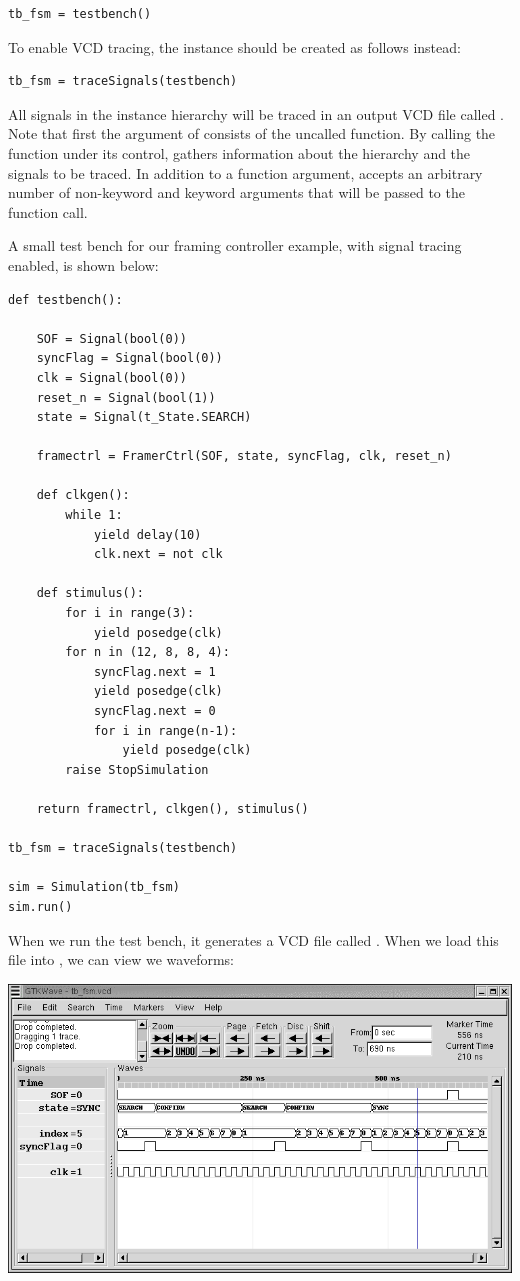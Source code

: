 \begin{verbatim}
tb_fsm = testbench()
\end{verbatim}

To enable VCD tracing, the instance should be created as follows
instead:

\begin{verbatim}
tb_fsm = traceSignals(testbench)
\end{verbatim}

All signals in the instance hierarchy will be traced in an output VCD
file called . Note that first the argument of
 consists of the uncalled function. By
calling the function under its control, 
gathers information about the hierarchy and the signals to be traced.
In addition to a function argument,  accepts
an arbitrary number of non-keyword and keyword arguments that will be
passed to the function call. 

A small test bench for our framing controller example,
with signal tracing enabled, is shown below:


\begin{verbatim}
def testbench():

    SOF = Signal(bool(0))
    syncFlag = Signal(bool(0))
    clk = Signal(bool(0))
    reset_n = Signal(bool(1))
    state = Signal(t_State.SEARCH)
            
    framectrl = FramerCtrl(SOF, state, syncFlag, clk, reset_n)

    def clkgen():
        while 1:
            yield delay(10)
            clk.next = not clk

    def stimulus():
        for i in range(3):
            yield posedge(clk)
        for n in (12, 8, 8, 4):
            syncFlag.next = 1
            yield posedge(clk)
            syncFlag.next = 0
            for i in range(n-1):
                yield posedge(clk)
        raise StopSimulation
        
    return framectrl, clkgen(), stimulus()

tb_fsm = traceSignals(testbench)

sim = Simulation(tb_fsm)
sim.run()
\end{verbatim}

When we run the test bench, it generates a VCD file
called . When we load this file into
, we can view we waveforms:

\ifpdf
\includegraphics{tbfsm.png}
\fi

